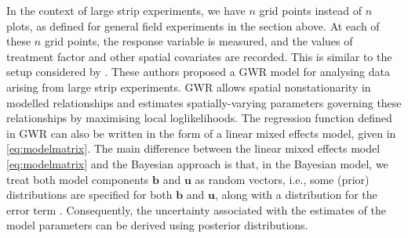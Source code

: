 \documentclass[a4paper]{article}   	%
\newcommand{\N}{\mathcal{N}}
\begin{document}
	In the context of large strip experiments, we have $n$ grid points instead of $n$ plots, as defined for general field experiments in the section above. At each of these $n$ grid points, the response variable is measured, and the values of treatment factor and other spatial covariates are recorded. This is similar to the setup considered by \textcite{Rakshit2020Novel}. These authors proposed a GWR model for analysing data arising from large strip experiments. GWR allows spatial nonstationarity in modelled relationships and estimates spatially-varying parameters governing these relationships by maximising local loglikelihoods. The regression function defined in GWR can also be written in the form of a linear mixed effects model, given in \eqref{eq:modelmatrix}. The main difference between the linear mixed effects model \eqref{eq:modelmatrix} and the Bayesian approach is that, in the Bayesian model, we treat both model components $\bm{b}$ and $\bm{u}$ as random vectors, i.e., some (prior) distributions are specified for both $\bm{b}$ and $\bm{u}$, along with a distribution for the error term \parencite{Burkner2017Brms}. Consequently, the uncertainty associated with the estimates of the model parameters can be derived using posterior distributions. 	
	
	
\end{document}
